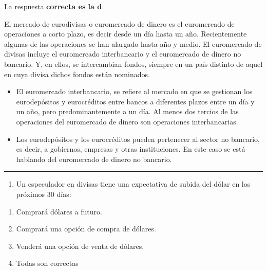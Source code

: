 \documentclass[
  letterpaper,
  DIV=11,
  numbers=noendperiod]{scrreprt}
\providecommand{\tightlist}{%
  \setlength{\itemsep}{0pt}\setlength{\parskip}{0pt}}\usepackage{longtable,booktabs,array}
\begin{document}
\begin{tcolorbox}[enhanced jigsaw, left=2mm, opacityback=0, colback=white, breakable, arc=.35mm, bottomrule=.15mm, rightrule=.15mm, toprule=.15mm, leftrule=.75mm, colframe=quarto-callout-tip-color-frame]
\begin{minipage}[t]{5.5mm}
\textcolor{quarto-callout-tip-color}{\faLightbulb}
\end{minipage}%
\begin{minipage}[t]{\textwidth - 5.5mm}

La respuesta \textbf{correcta es la d}.

El mercado de eurodivisas o euromercado de dinero es el euromercado de
operaciones a corto plazo, es decir desde un día hasta un año.
Recientemente algunas de las operaciones se han alargado hasta año y
medio. El euromercado de divisas incluye el euromercado interbancario y
el euromercado de dinero no bancario. Y, en ellos, se intercambian
fondos, siempre en un país distinto de aquel en cuya divisa dichos
fondos están nominados.

\begin{itemize}
\item
  El euromercado interbancario, se refiere al mercado en que se
  gestionan los eurodepósitos y eurocréditos entre bancos a diferentes
  plazos entre un día y un año, pero predominantemente a un día. Al
  menos dos tercios de las operaciones del euromercado de dinero son
  operaciones interbancarias.
\item
  Los eurodepósitos y los eurocréditos pueden pertenecer al sector no
  bancario, es decir, a gobiernos, empresas y otras instituciones. En
  este caso se está hablando del euromercado de dinero no bancario.
\end{itemize}

\end{minipage}%
\end{tcolorbox}

\begin{center}\rule{0.5\linewidth}{0.5pt}\end{center}

\begin{enumerate}
\def\labelenumi{\arabic{enumi}.}
\setcounter{enumi}{8}
\tightlist
\item
  Un especulador en divisas tiene una expectativa de subida del dólar en
  los próximos 30 días:
\end{enumerate}

\begin{enumerate}
\def\labelenumi{\alph{enumi})}
\item
  Comprará dólares a futuro.
\item
  Comprará una opción de compra de dólares.
\item
  Venderá una opción de venta de dólares.
\item
  Todas son correctas
\end{enumerate}
\end{document}
